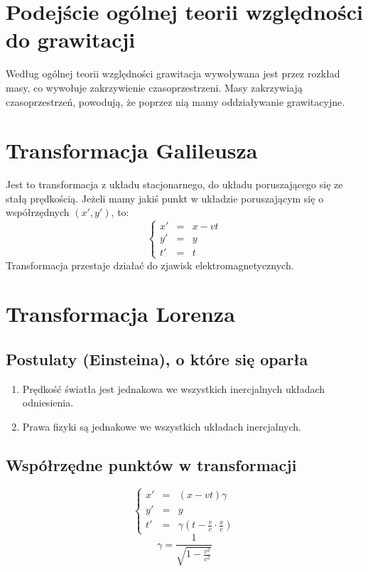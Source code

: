 \documentclass [a4paper, 11pt, oneside]{book}
\begin{document}
	\section{Podejście ogólnej teorii względności do grawitacji} %
	\label{sec:podej_cie_og_lnej_teorii_wzgl_dno_ci_do_grawitacji}
		Według ogólnej teorii względności grawitacja wywoływana jest przez rozkład masy, co wywołuje zakrzywienie czasoprzestrzeni. Masy zakrzywiają czasoprzestrzeń, powodują, że poprzez nią mamy oddziaływanie grawitacyjne.
	
	\section{Transformacja Galileusza} %
	\label{sec:transformacja_galileusza}
		Jest to transformacja z układu stacjonarnego, do układu poruszającego się ze stałą prędkością. Jeżeli mamy jakiś punkt w układzie poruszającym się o współrzędnych $(x', y')$, to:
		\[
			\left\{\begin{array}{ccc}
				x' & = & x-vt\\
				y' & = & y\\
				t' & = & t
			\end{array}\right.
		\]
		Transformacja przestaje działać do zjawisk elektromagnetycznych.

	\section{Transformacja Lorenza} %
	\label{sec:transformacja_lorenza}
		\subsection{Postulaty (Einsteina), o które się oparła} %
		\label{sub:postulaty_o_kt_re_si_opar_a}
			\begin{enumerate}
				\item Prędkość światła jest jednakowa we wszystkich inercjalnych układach odniesienia.
				\item Prawa fizyki są jednakowe we wszystkich układach inercjalnych.
			\end{enumerate}
		\subsection{Współrzędne punktów w transformacji} %
		\label{sub:wsp_rz_dne_punkt_w_w_transformacji}
			\[
				\left\{\begin{array}{ccc}
					x' & = & (x-vt)\gamma\\
					y' & = & y\\
					t' & = & \gamma(t-\frac{v}c \cdot \frac{x}c)
				\end{array}\right.
			\]
			\[
				\gamma = \frac{1}{\sqrt{1-\frac{v^2}{c^2}}}
			\]
\end{document}
